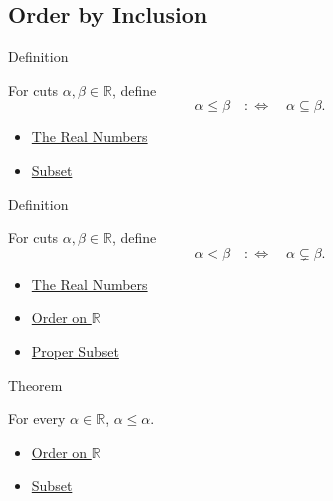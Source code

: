 \subsection*{Order by Inclusion}

\begin{definitionbox}{Definition}
\begin{definition}
\label{def:order-on-r}
For cuts $\alpha,\beta\in\mathbb{R}$, define
\[
\alpha\le\beta \quad:\Longleftrightarrow\quad \alpha\subseteq\beta.
\]
\end{definition}
\end{definitionbox}

\begin{dependencies}
\begin{itemize}
  \item \hyperref[def:reals]{The Real Numbers}
  \item \hyperref[def:subset]{Subset}
\end{itemize}
\end{dependencies}

\begin{definitionbox}{Definition}
\begin{definition}
\label{def:strict-order-on-r}
For cuts $\alpha,\beta\in\mathbb{R}$, define
\[
\alpha<\beta \quad:\Longleftrightarrow\quad \alpha\subsetneq\beta.
\]
\end{definition}
\end{definitionbox}

\begin{dependencies}
\begin{itemize}
  \item \hyperref[def:reals]{The Real Numbers}
  \item \hyperref[def:order-on-r]{Order on $\mathbb{R}$}
  \item \hyperref[def:proper-subset]{Proper Subset}
\end{itemize}
\end{dependencies}

\begin{theorembox}{Theorem}
\begin{theorem}
\label{thm:order-on-r-reflexive}
For every $\alpha\in\mathbb{R}$, $\alpha\le\alpha$.
\end{theorem}
\end{theorembox}

\begin{dependencies}
\begin{itemize}
  \item \hyperref[def:order-on-r]{Order on $\mathbb{R}$}
  \item \hyperref[def:subset]{Subset}
\end{itemize}
\end{dependencies}

